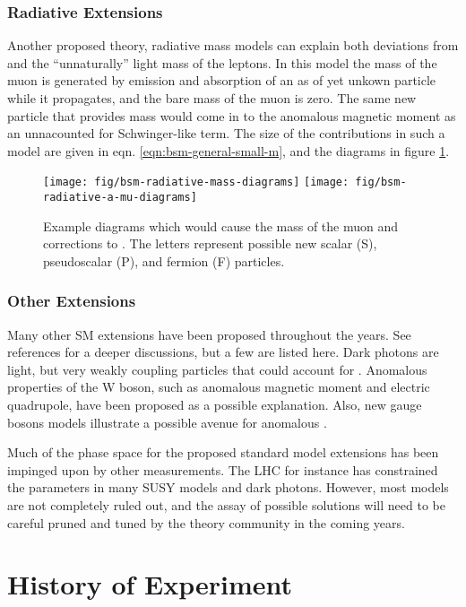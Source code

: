 \subsubsection{Radiative Extensions}
Another proposed theory, radiative mass models can explain both deviations from \gmtwo and the ``unnaturally'' light mass of the leptons.  In this model the mass of the muon is generated by emission and absorption of an as of yet unkown particle while it propagates, and the bare mass of the muon is zero.  The same new particle that provides mass would come in to the anomalous magnetic moment as an unnacounted for Schwinger-like term.  The size of the contributions in such a model are given in eqn. \ref{eqn:bsm-general-small-m}, and the diagrams in figure \ref{fig:bsm-radiative-diagrams}\cite{a-mu-harbinger}.

\begin{figure}
\label{fig:bsm-radiative-diagrams}
\centering
\texttt{[image: fig/bsm-radiative-mass-diagrams]}
\texttt{[image: fig/bsm-radiative-a-mu-diagrams]}
\caption{Example diagrams which would cause the mass of the muon and corrections to \mugmtwo.  The letters represent possible new scalar (S), pseudoscalar (P), and fermion (F) particles.}
\end{figure}

\subsubsection{Other Extensions}

Many other SM extensions have been proposed throughout the years.  See references \cite{a-mu-harbinger, the-muon-g-2, e989-tdr} for a deeper discussions, but a few are listed here.  Dark photons are light, but very weakly coupling particles that could account for \mugmtwo.  Anomalous properties of the W boson, such as anomalous magnetic moment and electric quadrupole, have been proposed as a possible explanation.  Also, new gauge bosons models illustrate a possible avenue for anomalous \gmtwo.

Much of the phase space for the proposed standard model extensions has been impinged upon by other measurements.  The LHC for instance has constrained the parameters in many SUSY models and dark photons.  However, most models are not completely ruled out, and the assay of possible solutions will need to be careful pruned and tuned by the theory community in the coming years.


\section{History of Experiment} \label{sec:history-expt}

